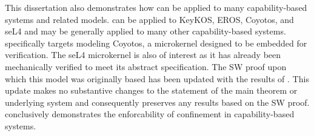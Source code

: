 This dissertation also demonstrates how \TMmodelName{} can be applied to many capability-based systems and related models.
\TMmodelName{} can be applied to KeyKOS, EROS, Coyotos, and seL4 and may be generally applied to many other capability-based systems.
\TMmodelName{} specifically targets modeling Coyotos, a microkernel designed to be embedded for verification.
The seL4 microkernel is also of interest as it has already been mechanically verified to meet its abstract specification.
The SW proof upon which this model was originally based has been updated with the results of \TMmodelName{}.
This update makes no substantive changes to the statement of the main theorem or underlying system and consequently preserves any results based on the SW proof.
\TMmodelName{} conclusively demonstrates the enforcability of confinement in capability-based systems.

